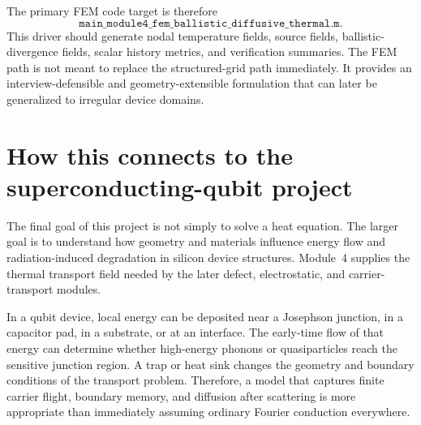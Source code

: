 \documentclass[11pt]{article}
\begin{document}
The primary FEM code target is therefore
\begin{equation}
    \texttt{main\_module4\_fem\_ballistic\_diffusive\_thermal.m}.
\end{equation}
This driver should generate nodal temperature fields, source fields, ballistic-divergence fields, scalar history metrics, and verification summaries. The FEM path is not meant to replace the structured-grid path immediately. It provides an interview-defensible and geometry-extensible formulation that can later be generalized to irregular device domains.

\section{How this connects to the superconducting-qubit project}
The final goal of this project is not simply to solve a heat equation. The larger goal is to understand how geometry and materials influence energy flow and radiation-induced degradation in silicon device structures. Module~4 supplies the thermal transport field needed by the later defect, electrostatic, and carrier-transport modules.

In a qubit device, local energy can be deposited near a Josephson junction, in a capacitor pad, in a substrate, or at an interface. The early-time flow of that energy can determine whether high-energy phonons or quasiparticles reach the sensitive junction region. A trap or heat sink changes the geometry and boundary conditions of the transport problem. Therefore, a model that captures finite carrier flight, boundary memory, and diffusion after scattering is more appropriate than immediately assuming ordinary Fourier conduction everywhere.
\end{document}

